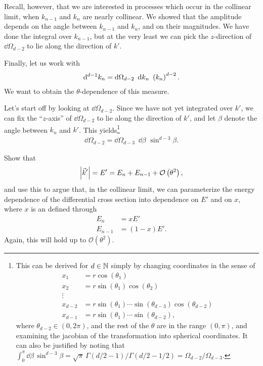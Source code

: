 Recall, however, that we are interested in processes which occur in the collinear limit, when \(k_{n-1}\) and \(k_{n}\) are nearly collinear.
%
We showed that the amplitude depends on the angle between \(k_{n-1}\) and \(k_n\), and on their magnitudes.
%
We have done the integral over \(k_{n-1}\), but at the very least we can pick the \(z\)-direction of \(\dd \Omega_{d-2}\) to lie along the direction of \(k'\).

Finally, let us work with
\begin{align}
    \label{eq:n_measure}
    \dd^{d-1} k_n
    =
    \dd \Omega_{d-2}
    \,\,\,
    \dd k_n
    \,\,
    \le(k_n\ri)^{d-2}
    .
\end{align}
%
We want to obtain the \(\theta\)-dependence of this measure.

Let's start off by looking at \(\dd \Omega_{d-2}\).
%
Since we have not yet integrated over \(k'\), we can fix the ``\(z\)-axis'' of \(\dd\Omega_{d-2}\) to lie along the direction of \(k'\), and let \(\beta\) denote the angle between \(k_n\) and \(k'\).
%
This yields\footnote{
    This can be derived for \(d \in \mathbb N\) simply by changing coordinates in the sense of
    \begin{align}
        x_1 &= r \cos(\theta_1)
        \\
        x_2 &= r \sin(\theta_1)\cos(\theta_2)
        \\
        \vdots
        \\
        x_{d-2} &= r \sin(\theta_1)\cdots\sin(\theta_{d-3})\cos(\theta_{d-2})
        \\
        x_{d-1} &= r \sin(\theta_1)\cdots\sin(\theta_{d-2})
        ,
    \end{align}
    where \(\theta_{d-2} \in (0, 2\pi)\), and the rest of the \(\theta\) are in the range \((0, \pi)\), and examining the jacobian of the transformation into spherical coordinates.
    It can also be justified by noting that \(\int_0^\pi \dd \beta\,\sin^{d-3}\beta = \sqrt{\pi}\,\Gamma(d/2-1)/\Gamma(d/2 - 1/2) = \Omega_{d-2}/\Omega_{d-3}\).
}
\begin{align}
    \dd \Omega_{d-2}
    =
    \dd \Omega_{d-3}
    \,\,\,
    \dd \beta
    \,\,
    \sin^{d-3}\beta
    .
\end{align}


\begin{exercise*}
    Show that
    \begin{align}
        \abs{\Vec{k}'}
        =
        E'
        =
        E_n + E_{n-1} + \mathcal{O}\left(\theta^2\right)
        ,
    \end{align}
    and use this to argue that, in the collinear limit, we can parameterize the energy dependence of the differential cross section into dependence on \(E'\) and on \(x\), where \(x\) is an  defined through
    \begin{align}
        E_n &= x E'
        \\
        E_{n-1} &= (1-x)E'
        .
    \end{align}
    Again, this will hold up to \(\mathcal{O}(\theta^2)\).
\end{exercise*}

